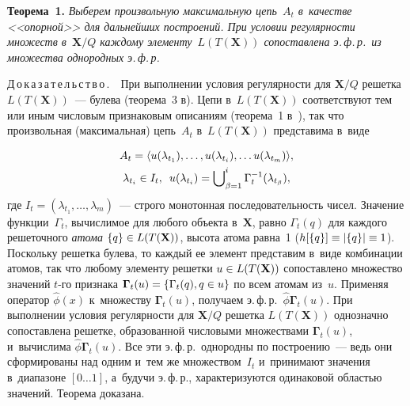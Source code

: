 \begin{multicols}{2}
\smallskip

\noindent
\textbf{Теорема~1.} \textit{Выберем произвольную максимальную цепь~$A_t$ 
в~качестве <<опорной>> для дальнейших построений. При условии 
регулярности множеств в~$\mathbf{X}/Q$ каждому 
элементу~$L(T(\mathbf{X}))$ сопоставлена э.\,ф.\,р.\ из множества 
однородных э.\,ф.\,р.} 

\smallskip

\noindent
Д\,о\,к\,а\,з\,а\,т\,е\,л\,ь\,с\,т\,в\,о\,.\ \  При выполнении условия ре\-гу\-ляр\-ности 
для $\mathbf{X}/Q$ решетка $L(T(\mathbf{X}))$~--- булева (тео\-ре\-ма~3 
в\cite{9-tr}). Цепи в~$L(T(\mathbf{X}))$ соответствуют тем или иным чис\-ло\-вым 
признаковым описаниям (тео\-ре\-ма~1 в~\cite{4-tr}), так что произвольная 
(максимальная) цепь~$A_t$ в~$L(T(\mathbf{X}))$ пред\-ста\-ви\-ма в~виде

\noindent 
\begin{multline*}
A_t= 
\langle u(\lambda_{t_1}), \ldots, u(\lambda_{t_i}), \ldots u(\lambda_{t_m})\rangle,\\ 
\lambda_{t_i}\in I_t,\enskip u(\lambda_{t_i})= \bigcup\nolimits^i_{\beta=1} 
\Gamma_t^{-1} (\lambda_{t_\beta}),
\end{multline*}
 где $I_t= (\lambda_{t_1},\ldots , 
\lambda_m)$~--- строго монотонная по\-сле\-до\-ва\-тель\-ность чисел. Значение 
функции~$\Gamma_t$, вы\-чис\-ли\-мое для любого объекта в~$\mathbf{X}$, рав\-но 
$\Gamma_t(q)$ для каж\-до\-го решеточного \textit{атома} $\{q\} \hm\in 
L(T(\mathbf{X}))$, высота атома рав\-на~1 ($h[\{q\}] \hm\equiv \vert \{q\}\vert 
\hm\equiv 1$). Поскольку решетка булева, то каж\-дый ее элемент пред\-ста\-вим 
в~виде комбинации атомов, так что любому элементу решетки $u\hm\in 
L(T(\mathbf{X}))$ со\-по\-став\-ле\-но множество значений $t$-го при\-зна\-ка 
$\bm{\Gamma}_t(u)\hm= \{ \Gamma_t(q), q\hm\in u\}$ по всем атомам из~$u$. 
Применяя оператор $\hat{\phi}(x)$ к~множеству $\bm{\Gamma}_t(u)$, получаем 
э.\,ф.\,р.\ $\hat{\phi}\bm{\Gamma}_t(u)$. При выполнении условия ре\-гу\-ляр\-ности 
для $\mathbf{X}/Q$ решетка $L(T(\mathbf{X}))$ однозначно со\-по\-став\-ле\-на 
решетке, образованной чис\-ло\-вы\-ми множествами $\bm{\Gamma}_t(u)$, 
и~вы\-чис\-ли\-ма $\hat{\phi}\bm{\Gamma}_t(u)$. Все эти э.\,ф.\,р.\ однородны по 
по\-стро\-ению~--- ведь они сформированы над одним и~тем же множеством~$I_t$ и~принимают значения в~диапазоне $[0\ldots1]$, а~будучи э.\,ф.\,р., 
характеризуются одинаковой об\-ластью значений.  Тео\-ре\-ма доказана.

\smallskip
     

\end{multicols}
